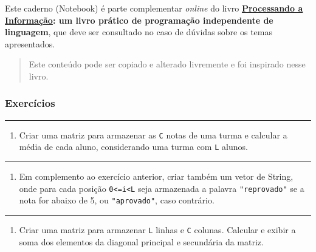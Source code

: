 \documentclass[12pt,a4paper]{article}
\providecommand{\tightlist}{%
      \setlength{\itemsep}{0pt}\setlength{\parskip}{0pt}}
\begin{document}
Este caderno (Notebook) é parte complementar \emph{online} do livro
\textbf{\href{https://editora.ufabc.edu.br/matematica-e-ciencias-da-computacao/58-processando-a-informacao}{Processando
a Informação}: um livro prático de programação independente de
linguagem}, que deve ser consultado no caso de dúvidas sobre os temas
apresentados.

\begin{quote}
Este conteúdo pode ser copiado e alterado livremente e foi inspirado
nesse livro.
\end{quote}

    \hypertarget{exercuxedcios}{%
\subsubsection{Exercícios}\label{exercuxedcios}}

    \begin{center}\rule{0.5\linewidth}{0.5pt}\end{center}

\begin{enumerate}
\def\labelenumi{\arabic{enumi}.}
\tightlist
\item
  Criar uma matriz para armazenar as \texttt{C} notas de uma turma e
  calcular a média de cada aluno, considerando uma turma com \texttt{L}
  alunos.
\end{enumerate}

    \begin{center}\rule{0.5\linewidth}{0.5pt}\end{center}

\begin{enumerate}
\def\labelenumi{\arabic{enumi}.}
\setcounter{enumi}{1}
\tightlist
\item
  Em complemento ao exercício anterior, criar também um vetor de String,
  onde para cada posição \texttt{0\textless{}=i\textless{}L} seja
  armazenada a palavra \texttt{"reprovado"} se a nota for abaixo de 5,
  ou \texttt{"aprovado"}, caso contrário.
\end{enumerate}

    \begin{center}\rule{0.5\linewidth}{0.5pt}\end{center}

\begin{enumerate}
\def\labelenumi{\arabic{enumi}.}
\setcounter{enumi}{2}
\tightlist
\item
  Criar uma matriz para armazenar \texttt{L} linhas e \texttt{C}
  colunas. Calcular e exibir a soma dos elementos da diagonal principal
  e secundária da matriz.
\end{enumerate}
\end{document}
